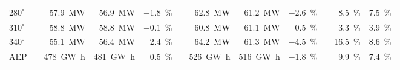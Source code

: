 \documentclass[conf]{new-aiaa}
\begin{document}
\begin{table}[htpb!]
\begin{tabular}{@{}lcrrrcrrrcrr@{}}
\multicolumn{1}{l}{$280^{\circ}$} & & \SI[per-mode=symbol]{57.9}{\mega\watt} &\SI[per-mode=symbol]{56.9}{\mega\watt} &\SI[per-mode=symbol]{-1.8}{\percent} & &\SI[per-mode=symbol]{62.8}{\mega\watt} &\SI[per-mode=symbol]{61.2}{\mega\watt} &\SI[per-mode=symbol]{-2.6}{\percent} & &\SI[per-mode=symbol]{8.5}{\percent} &\SI[per-mode=symbol]{7.5}{\percent} \\


\multicolumn{1}{l}{$310^{\circ}$} & & \SI[per-mode=symbol]{58.8}{\mega\watt} &\SI[per-mode=symbol]{58.8}{\mega\watt} &\SI[per-mode=symbol]{-0.1}{\percent} & &\SI[per-mode=symbol]{60.8}{\mega\watt} &\SI[per-mode=symbol]{61.1}{\mega\watt} &\SI[per-mode=symbol]{.5}{\percent} & &\SI[per-mode=symbol]{3.3}{\percent} &\SI[per-mode=symbol]{3.9}{\percent} \\

\multicolumn{1}{l}{$340^{\circ}$} & & \SI[per-mode=symbol]{55.1}{\mega\watt} &\SI[per-mode=symbol]{56.4}{\mega\watt} &\SI[per-mode=symbol]{2.4}{\percent} & &\SI[per-mode=symbol]{64.2}{\mega\watt} &\SI[per-mode=symbol]{61.3}{\mega\watt} &\SI[per-mode=symbol]{-4.5}{\percent} & &\SI[per-mode=symbol]{16.5}{\percent} &\SI[per-mode=symbol]{8.6}{\percent} \\

\hline
\multicolumn{1}{l}{AEP}& &\SI[per-mode=symbol]{478}{\giga\watt\hour} &\SI[per-mode=symbol]{481}{\giga\watt\hour} &\SI[per-mode=symbol]{0.5}{\percent} & &\SI[per-mode=symbol]{526}{\giga\watt\hour} &\SI[per-mode=symbol]{516}{\giga\watt\hour} &\SI[per-mode=symbol]{-1.8}{\percent} & &\SI[per-mode=symbol]{9.9}{\percent} &\SI[per-mode=symbol]{7.4}{\percent}\\ 
 \bottomrule
\end{tabular}

\end{table}
\end{document}
